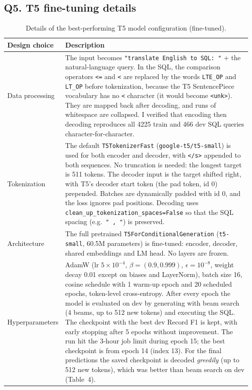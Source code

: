 \documentclass[11pt]{article}
\begin{document}
\subsection*{Q5. T5 fine-tuning details}
\begin{table}[H]
\centering
\begin{tabularx}{\textwidth}{lX}
\toprule
Design choice & Description \\
\midrule
Data processing &
The input becomes \texttt{"translate English to SQL: "} + the natural-language query. In the SQL, the comparison
operators \texttt{<=} and \texttt{<} are replaced by the words \texttt{LTE\_OP} and \texttt{LT\_OP} before tokenization,
because the T5 SentencePiece vocabulary has no \texttt{<} character (it would become \texttt{<unk>}). They are mapped
back after decoding, and runs of whitespace are collapsed. I verified that encoding then decoding reproduces all
4225 train and 466 dev SQL queries character-for-character. \\
Tokenization &
The default \texttt{T5TokenizerFast} (\texttt{google-t5/t5-small}) is used for both encoder and decoder, with
\texttt{</s>} appended to both sequences. No truncation is needed: the longest target is 511 tokens. The decoder input is the
target shifted right, with T5's decoder start token (the pad token, id 0) prepended. Batches are dynamically padded
with id 0, and the loss ignores pad positions. Decoding uses
\texttt{clean\_up\_tokenization\_spaces=False} so that the SQL spacing (e.g.\ \texttt{" , "}) is preserved. \\
Architecture &
The full pretrained \texttt{T5ForConditionalGeneration} (\texttt{t5-small}, 60.5M parameters) is fine-tuned:
encoder, decoder, shared embeddings and LM head. No layers are frozen. \\
Hyperparameters &
AdamW (lr $5\times10^{-4}$, $\beta=(0.9,0.999)$, $\epsilon=10^{-8}$, weight decay 0.01 except on biases and
LayerNorm), batch size 16, cosine schedule with 1 warm-up epoch and 20 scheduled epochs, token-level cross-entropy.
After every epoch the model is evaluated on dev by generating with beam search (4 beams, up to 512 new tokens) and
executing the SQL. The checkpoint with the best dev Record F1 is kept, with early stopping after 5 epochs without
improvement. The run hit the 3-hour job limit during epoch 15; the best checkpoint is from epoch 14 (index 13).
For the final predictions the saved checkpoint is decoded \emph{greedily} (up to 512 new tokens), which was
better than beam search on dev (Table~4). \\
\bottomrule
\end{tabularx}
\caption{Details of the best-performing T5 model configuration (fine-tuned).}
\end{table}
\end{document}
